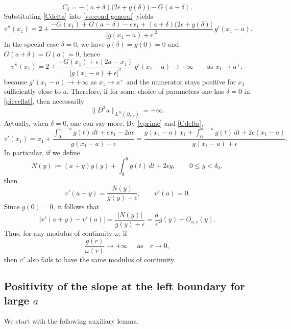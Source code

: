 \documentclass[reqno,11pt]{amsart}
\numberwithin{equation}{section}
\theoremstyle{remark}
\begin{document}
\begin{equation}\label{Cdelta}
C_\delta
=-(a+\delta)\bigl(2\epsilon+g(\delta)\bigr)-G(a+\delta).
\end{equation}
Substituting \eqref{Cdelta} into \eqref{vsecond-general} yields
\begin{equation}\label{vsecond}
v''(x_1)
=
2+\frac{-G(x_1)+G(a+\delta)-\epsilon x_1+(a+\delta)\bigl(2\epsilon+g(\delta)\bigr)}{\bigl[g(x_1-a)+\epsilon\bigr]^2}\,
g'(x_1-a).
\end{equation}
In the special case $\delta=0$, we have $g(\delta)=g(0)=0$ and $G(a+\delta)=G(a)=0$, hence
\begin{equation}\label{c11blowup}
v''(x_1)
=
2+\frac{-G(x_1)+\epsilon(2a-x_1)}{\bigl[g(x_1-a)+\epsilon\bigr]^2}\,g'(x_1-a)
\to +\infty
\qquad\text{as }x_1\to a^+,
\end{equation}
because $g'(x_1-a)\to+\infty$ as $x_1\to a^+$ and the numerator stays positive for $x_1$ sufficiently close to $a$.
Therefore, if for some choice of parameters one has $\delta=0$ in \eqref{pieceflat}, then necessarily
\[
\|D^2u\|_{L^\infty(\Omega_{\epsilon,a})}=+\infty.
\]
Actually, when $\delta=0$, one can say more. By \eqref{vprime} and \eqref{Cdelta},
\[
v'(x_1)
=
x_1+\frac{\int_0^{x_1-a} g(t)\,dt+\epsilon x_1-2a\epsilon}{g(x_1-a)+\epsilon}
=
\frac{g(x_1-a)\,x_1+\int_0^{x_1-a} g(t)\,dt+2\epsilon(x_1-a)}{g(x_1-a)+\epsilon}.
\]
In particular, if  we define
\[
N(y):=(a+y)g(y)+\int_0^y g(t)\,dt+2\epsilon y,
\qquad 0\le y<\delta_0,
\]
then
\[
v'(a+y)=\frac{N(y)}{g(y)+\epsilon},
\qquad
v'(a)=0.
\]
Since $g(0)=0$, it follows that
\begin{equation}
\label{eq:v'g}
|v'(a+y)-v'(a)|=\frac{|N(y)|}{g(y)+\epsilon} =\frac{a}{\epsilon}g(y)+O_{a,\epsilon}(y).
\end{equation}
Thus, for any modulus of continuity $\omega$, if 
$$\frac{g(r)}{\omega(r)}\to +\infty\quad \text{ as} \quad r\to 0,$$ 
then $v'$ also fails to have the same modulus of continuity.

\subsection{Positivity of the slope at the left boundary for large $a$}

We start with the following auxiliary lemma. 
\end{document}
